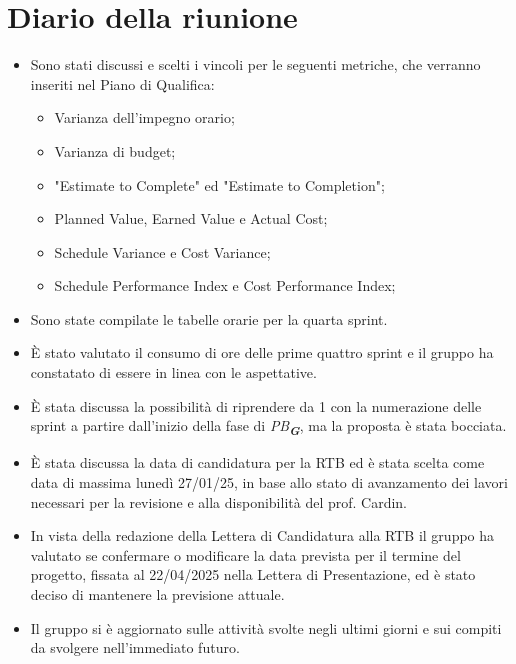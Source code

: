 
\section{Diario della riunione}

\begin{itemize}
    \item Sono stati discussi e scelti i vincoli per le seguenti metriche, che verranno inseriti nel Piano di Qualifica:
    \begin{itemize}
        \item Varianza dell'impegno orario;
        \item Varianza di budget;
        \item "Estimate to Complete" ed "Estimate to Completion";
        \item Planned Value, Earned Value e Actual Cost;
        \item Schedule Variance e Cost Variance;
        \item Schedule Performance Index e Cost Performance Index;
    \end{itemize}
    \item Sono state compilate le tabelle orarie per la quarta sprint.
    \item È stato valutato il consumo di ore delle prime quattro sprint e il gruppo ha constatato di essere in linea con le aspettative.
    \item È stata discussa la possibilità di riprendere da 1 con la numerazione delle sprint a partire dall'inizio della fase di \emph{PB}\textsubscript{\textit{\textbf{G}}},
    ma la proposta è stata bocciata.
    \item È stata discussa la data di candidatura per la RTB ed è stata scelta come data di massima lunedì 27/01/25,
    in base allo stato di avanzamento dei lavori necessari per la revisione e alla disponibilità del prof. Cardin.
    \item In vista della redazione della Lettera di Candidatura alla RTB il gruppo ha valutato se confermare o modificare la data prevista per il termine del progetto,
    fissata al 22/04/2025 nella Lettera di Presentazione, ed è stato deciso di mantenere la previsione attuale.
    \item Il gruppo si è aggiornato sulle attività svolte negli ultimi giorni e sui compiti da svolgere nell'immediato futuro.
 \end{itemize}
